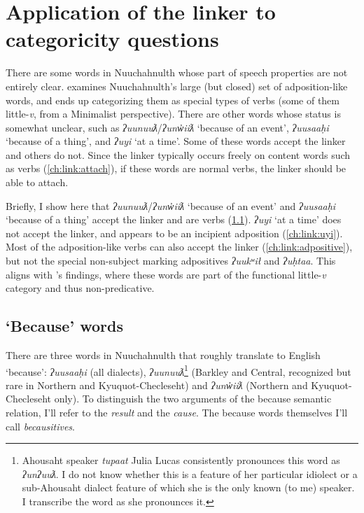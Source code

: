 \section{Application of the linker to categoricity questions} \label{ch:link:application}

There are some words in Nuuchahnulth whose part of speech properties are not entirely clear. \cite{woo2007b} examines Nuuchahnulth's large (but closed) set of adposition-like words, and ends up categorizing them as special types of verbs (some of them little-\textit{v}, from a Minimalist perspective). There are other words whose status is somewhat unclear, such as \textit{ʔuunuuƛ}/\textit{ʔunw̓iiƛ} `because of an event', \textit{ʔuusaaḥi} `because of a thing', and \textit{ʔuyi} `at a time'. Some of these words accept the linker and others do not. Since the linker typically occurs freely on content words such as verbs (\ref{ch:link:attach}), if these words are normal verbs, the linker should be able to attach.

Briefly, I show here that \textit{ʔuunuuƛ}/\textit{ʔunw̓iiƛ} `because of an event' and \textit{ʔuusaaḥi} `because of a thing' accept the linker and are verbs (\ref{ch:link:because}). \textit{ʔuyi} `at a time' does not accept the linker, and appears to be an incipient adposition (\ref{ch:link:uyi}). Most of the adposition-like verbs can also accept the linker (\ref{ch:link:adpositive}), but not the special non-subject marking adpositives \textit{ʔuukʷił} and \textit{ʔuḥtaa}. This aligns with \citeauthor{woo2007b}'s findings, where these words are part of the functional little-\textit{v} category and thus non-predicative.


\subsection{`Because' words} \label{ch:link:because}

There are three words in Nuuchahnulth that roughly translate to English `because': \textit{ʔuusaaḥi} (all dialects), \textit{ʔuunuuƛ}\footnote{Ahousaht speaker \textit{tupaat} Julia Lucas consistently pronounces this word as \textit{ʔunʔuuƛ}. I do not know whether this is a feature of her particular idiolect or a sub-Ahousaht dialect feature of which she is the only known (to me) speaker. I transcribe the word as she pronounces it.} (Barkley and Central, recognized but rare in Northern and Kyuquot-Checleseht) and \textit{ʔunw̓iiƛ} (Northern and Kyuquot-Checleseht only). To distinguish the two arguments of the because semantic relation, I'll refer to the \textit{result} and the \textit{cause}. The because words themselves I'll call \textit{becausitives}.

